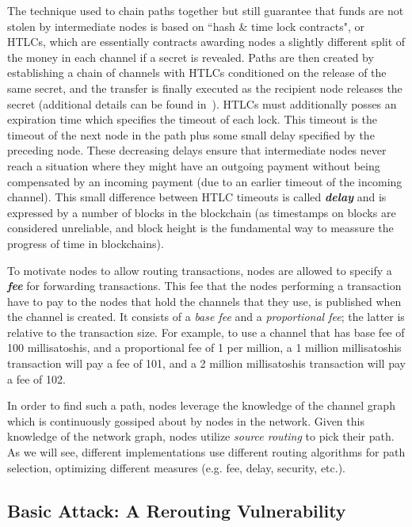 The technique used to chain paths together but still guarantee that funds are not stolen by intermediate nodes is based on ``hash \& time lock contracts", or HTLCs, which are essentially contracts awarding nodes a slightly different split of the money in each channel if a secret is revealed. Paths are then created by establishing a chain of channels with HTLCs conditioned on the release of the same secret, and the transfer is finally executed as the recipient node releases the secret (additional details can be found in~\cite{poon2016bitcoin}).
HTLCs must additionally posses an expiration time which specifies the timeout of each lock. This timeout is the timeout of the next node in the path plus some small delay specified by the preceding node. These decreasing delays ensure that intermediate nodes never reach a situation where they might have an outgoing payment without being compensated by an incoming payment (due to an earlier timeout of the incoming channel). 
This small difference between HTLC timeouts is called \emph{\textbf{delay}} and is expressed by a number of blocks in the blockchain (as timestamps on blocks are considered unreliable, and block height is the fundamental way to meassure the progress of time in blockchains).

To motivate nodes to allow routing transactions, nodes are allowed to specify a  \emph{\textbf{fee}} for forwarding transactions.
This fee that the nodes performing a transaction have to pay to the nodes that hold the channels that they use,
is published when the channel is created. It consists of a \emph{base fee} 
and a \emph{proportional fee}; the latter is relative to the transaction size. 
For example, to use a channel that has base fee of 100 millisatoshis, and a proportional fee of 1 per million, 
a 1 million millisatoshis transaction will pay a fee of 101, and a 
2 million millisatoshis transaction will pay a fee of 102.

In order to find such a path, nodes leverage the knowledge of the channel graph which is
continuously gossiped about by nodes in the network. 
Given this knowledge of the network graph, nodes utilize \emph{source routing} to pick their path. As we will see, different implementations use different 
routing algorithms for path selection, optimizing different measures (e.g. fee, delay, security, etc.).

\subsection{Basic Attack: A Rerouting Vulnerability}

